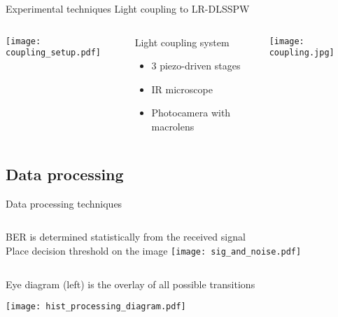   \begin{frame}{Experimental techniques}
               {Light coupling to LR-DLSSPW}
    \begin{columns}
        \texttt{[image: coupling\_setup.pdf]}
        \begin{block}{Light coupling system}
          \begin{itemize}
            \item 3 piezo-driven stages
            \item IR microscope
            \item Photocamera with macrolens
          \end{itemize}
        \end{block}
        \vspace{2mm}
        \begin{center}
          \texttt{[image: coupling.jpg]}
        \end{center}
    \end{columns}
    \begin{center}
    \end{center}
  \end{frame}


  \subsection{Data processing} %
  \label{sub:data_processing}
  
  \begin{frame}{Data processing techniques}
    \begin{columns}
        BER is determined statistically from the received signal\\
        \alert{Place decision threshold on the image}
        \texttt{[image: sig\_and\_noise.pdf]}
    \end{columns}
    Eye diagram (left) is the overlay of all possible transitions
    \begin{center}
      \texttt{[image: hist\_processing\_diagram.pdf]}
    \end{center}
  \end{frame}









